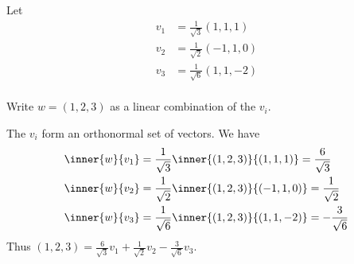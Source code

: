 \documentclass{article}
\begin{document}
\begin{example}
  Let
  \begin{align*}
    v_1 & = \frac{1}{\sqrt{3}}(1, 1, 1)  \\
    v_2 & = \frac{1}{\sqrt{2}}(-1, 1, 0) \\
    v_3 & = \frac{1}{\sqrt{6}}(1, 1, -2) \\
  \end{align*}

  Write $w = (1, 2, 3)$ as a linear combination of the $v_i$.

  The $v_i$ form an orthonormal set of vectors. We have
  \begin{align*}
    \inner{w}{v_1} & = \frac{1}{\sqrt{3}}\inner{(1, 2, 3)}{(1, 1, 1)} = \frac{6}{\sqrt{3}}   \\
    \inner{w}{v_2} & = \frac{1}{\sqrt{2}}\inner{(1, 2, 3)}{(-1, 1, 0)} = \frac{1}{\sqrt{2}}  \\
    \inner{w}{v_3} & = \frac{1}{\sqrt{6}}\inner{(1, 2, 3)}{(1, 1, -2)} = -\frac{3}{\sqrt{6}} \\
  \end{align*}
  Thus $(1, 2, 3) = \frac{6}{\sqrt{3}}v_1 + \frac{1}{\sqrt{2}}v_2 - \frac{3}{\sqrt{6}}v_3$.
\end{example}
\end{document}
